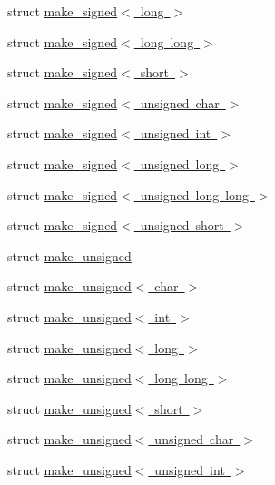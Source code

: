 \begin{DoxyCompactItemize}
\item 
struct \mbox{\hyperlink{structglm_1_1detail_1_1make__signed_3_01long_01_4}{make\+\_\+signed$<$ long $>$}}
\item 
struct \mbox{\hyperlink{structglm_1_1detail_1_1make__signed_3_01long_01long_01_4}{make\+\_\+signed$<$ long long $>$}}
\item 
struct \mbox{\hyperlink{structglm_1_1detail_1_1make__signed_3_01short_01_4}{make\+\_\+signed$<$ short $>$}}
\item 
struct \mbox{\hyperlink{structglm_1_1detail_1_1make__signed_3_01unsigned_01char_01_4}{make\+\_\+signed$<$ unsigned char $>$}}
\item 
struct \mbox{\hyperlink{structglm_1_1detail_1_1make__signed_3_01unsigned_01int_01_4}{make\+\_\+signed$<$ unsigned int $>$}}
\item 
struct \mbox{\hyperlink{structglm_1_1detail_1_1make__signed_3_01unsigned_01long_01_4}{make\+\_\+signed$<$ unsigned long $>$}}
\item 
struct \mbox{\hyperlink{structglm_1_1detail_1_1make__signed_3_01unsigned_01long_01long_01_4}{make\+\_\+signed$<$ unsigned long long $>$}}
\item 
struct \mbox{\hyperlink{structglm_1_1detail_1_1make__signed_3_01unsigned_01short_01_4}{make\+\_\+signed$<$ unsigned short $>$}}
\item 
struct \mbox{\hyperlink{structglm_1_1detail_1_1make__unsigned}{make\+\_\+unsigned}}
\item 
struct \mbox{\hyperlink{structglm_1_1detail_1_1make__unsigned_3_01char_01_4}{make\+\_\+unsigned$<$ char $>$}}
\item 
struct \mbox{\hyperlink{structglm_1_1detail_1_1make__unsigned_3_01int_01_4}{make\+\_\+unsigned$<$ int $>$}}
\item 
struct \mbox{\hyperlink{structglm_1_1detail_1_1make__unsigned_3_01long_01_4}{make\+\_\+unsigned$<$ long $>$}}
\item 
struct \mbox{\hyperlink{structglm_1_1detail_1_1make__unsigned_3_01long_01long_01_4}{make\+\_\+unsigned$<$ long long $>$}}
\item 
struct \mbox{\hyperlink{structglm_1_1detail_1_1make__unsigned_3_01short_01_4}{make\+\_\+unsigned$<$ short $>$}}
\item 
struct \mbox{\hyperlink{structglm_1_1detail_1_1make__unsigned_3_01unsigned_01char_01_4}{make\+\_\+unsigned$<$ unsigned char $>$}}
\item 
struct \mbox{\hyperlink{structglm_1_1detail_1_1make__unsigned_3_01unsigned_01int_01_4}{make\+\_\+unsigned$<$ unsigned int $>$}}

\end{DoxyCompactItemize}

